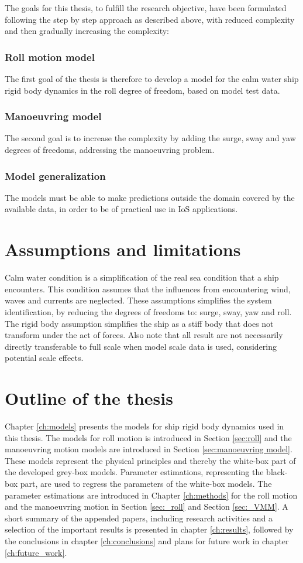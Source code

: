 \noindent 
The goals for this thesis, to fulfill the research objective, have been formulated following the step by step approach as described above, with reduced complexity and then gradually increasing the complexity:

\subsubsection*{Roll motion model}
The first goal of the thesis is therefore to develop a model for the calm water ship rigid body dynamics in the roll degree of freedom, based on model test data.

\subsubsection*{Manoeuvring model}
The second goal is to increase the complexity by adding the surge, sway and yaw degrees of freedoms, addressing the manoeuvring problem.

\subsubsection*{Model generalization}
The models must be able to make predictions outside the domain covered by the available data, in order to be of practical use in IoS applications.

\section{Assumptions and limitations}
Calm water condition is a simplification of the real sea condition that a ship encounters. This condition assumes that the influences from encountering wind, waves and currents are neglected. These assumptions simplifies the system identification, by reducing the degrees of freedoms to: surge, sway, yaw and roll. 
The rigid body assumption simplifies the ship as a stiff body that does not transform under the act of forces. 
Also note that all result are not necessarily directly transferable to full scale when model scale data is used, considering potential scale effects. 

\section{Outline of the thesis}
Chapter \ref{ch:models} presents the models for ship rigid body dynamics used in this thesis. The models for roll motion is introduced in Section \ref{sec:roll} and the manoeuvring motion models are introduced in Section \ref{sec:manoeuvring model}. These models represent the physical principles and thereby the white-box part of the developed grey-box models.
Parameter estimations, representing the black-box part, are used to regress the parameters of the white-box models. The parameter estimations are introduced in Chapter \ref{ch:methods} for the roll motion and the manoeuvring motion in Section \ref{sec:_roll} and Section \ref{sec:_VMM}. 
A short summary of the appended papers, including research activities and a selection of the important results is presented in chapter \ref{ch:results}, followed by the conclusions in chapter \ref{ch:conclusions} and plans for future work in chapter \ref{ch:future_work}.